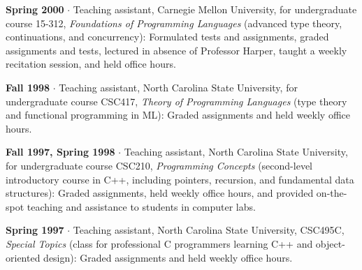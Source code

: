 \documentclass[ComputerScience]{vita}
\begin{document}
\begin{vita}
\begin{Teaching}
   \item {\bf Spring 2000} $\cdot$ Teaching assistant, Carnegie Mellon
   University, for undergraduate course 15-312, \emph{Foundations of
   Programming Languages} (advanced type theory, continuations, and concurrency): Formulated tests and assignments, graded
   assignments and tests, lectured in absence of Professor Harper,
   taught a weekly recitation session, and held office hours.

   \item {\bf Fall 1998} $\cdot$ Teaching assistant, North Carolina
   State University, for undergraduate course CSC417, \emph{Theory of
   Programming Languages} (type theory and functional programming in ML):
   Graded assignments and held weekly office hours.

   \item {\bf Fall 1997, Spring 1998} $\cdot$ Teaching assistant,
   North Carolina State University, for undergraduate course CSC210,
   {\em Programming Concepts} (second-level introductory course in
   C++, including pointers, recursion, and fundamental data
   structures): Graded assignments, held weekly office hours, and
   provided on-the-spot teaching and assistance to students in
   computer labs.

   \item {\bf Spring 1997} $\cdot$ Teaching assistant, North
   Carolina State University, CSC495C, {\em
   Special Topics} (class for professional C programmers learning C++ and object-oriented design):  Graded assignments and held weekly office
   hours.

\end{Teaching}



\end{vita}
\end{document}

